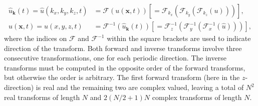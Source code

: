 \documentclass[final,1p,times]{elsarticle}
\begin{document}
\begin{align}
\hat{u}_{\bm{k}}(t) = \hat{{u}}(k_x, k_y, k_z, t) &= \mathcal{F}({u}(\bm{x}, t)) \left[= \mathcal{F}_{k_x} \left(\mathcal{F}_{k_y} \left( \mathcal{F}_{k_z} ({u}) \right) \right) \right], \label{eq:fft}\\
{u}(\bm{x}, t) = {u}(x, y, z, t) &= \mathcal{F}^{-1}(\hat{{u}}_{\bm{k}}(t)) \left[= \mathcal{F}^{-1}_{z}\left(\mathcal{F}^{-1}_{y}\left(\mathcal{F}^{-1}_{x}(\hat{{u}})\right)\right)\right], \label{eq:ifft}
\end{align}
where the indices on $\mathcal{F}$ and $\mathcal{F}^{-1}$ within the square brackets are used to indicate direction of the transform. Both forward and inverse transforms involve three consecutive transformations, one for each periodic direction. The inverse transforms must be computed in the opposite order of the forward transforms, but otherwise the order is arbitrary. The first forward transform (here in the $z$-direction) is real and the remaining two are complex valued, leaving a total of $N^2$ real transforms of length $N$ and $2(N/2+1)N$ complex transforms of length $N$.

\end{document}

